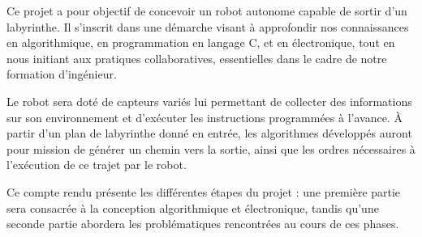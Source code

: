 Ce projet a pour objectif de concevoir un robot autonome capable de sortir d’un labyrinthe. 
Il s’inscrit dans une démarche visant à approfondir nos connaissances en algorithmique, en 
programmation en langage C, et en électronique, tout en nous initiant aux pratiques collaboratives, 
essentielles dans le cadre de notre formation d’ingénieur.

Le robot sera doté de capteurs variés lui permettant de collecter des informations sur son
environnement et d’exécuter les instructions programmées à l’avance. À partir d’un plan de 
labyrinthe donné en entrée, les algorithmes développés auront pour mission de générer un chemin 
vers la sortie, ainsi que les ordres nécessaires à l’exécution de ce trajet par le 
robot.

Ce compte rendu présente les différentes étapes du projet : une première partie sera consacrée à 
la conception algorithmique et électronique, tandis qu’une seconde partie abordera les 
problématiques rencontrées au cours de ces phases.